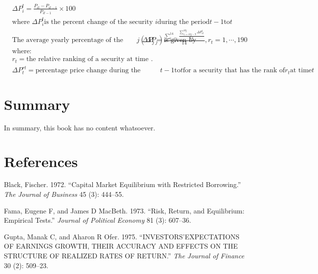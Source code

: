 \documentclass[
  letterpaper,
  DIV=11,
  numbers=noendperiod]{scrreprt}
\newlength{\cslhangindent}
\newlength{\cslentryspacingunit} %
\newenvironment{CSLReferences}[2] %
 {%
  \setlength{\parindent}{0pt}
  \ifodd #1
  \let\oldpar\par
  \def\par{\hangindent=\cslhangindent\oldpar}
  \fi
  \setlength{\parskip}{#2\cslentryspacingunit}
 }%
 {}
\begin{document}
\begin{align}
    & \Delta P_{i}^{t} = \frac{P_{it}-P_{it-1}}{P_{it-1}} \times 100 \\
    & \text{where } \Delta P_{i}^{t} \text{is the percent change of the security } i \text{during the period} t-1 \text{to} t \nonumber \\
    & \text{The average yearly percentage of the prices change for portfolio} j (\Delta P_j) \text{is given by}
    & \Delta P_{j} =\frac{\sum_{t=1}^{14} \frac{\sum_{r_t=10j-9}^{10j} \Delta P_{rt}^{t}}{14} }{14}, r_{t}=1,\cdots,190 \nonumber\\
    & \text{where:} \nonumber \\
    & r_{t} = \text{the relative ranking of a security at time t according to its prediction error at that year}. \\
    & \Delta P_{t}^{rt} = \text{percentage price change during the period} t-1 \text{to} t \text{for a security that has the rank of} r_t \text{at time} t
\end{align}
\label{Equation:OferEquation1975}


\hypertarget{summary}{%
\chapter{Summary}\label{summary}}

In summary, this book has no content whatsoever.


\hypertarget{references}{%
\chapter*{References}\label{references}}


\hypertarget{refs}{}
\begin{CSLReferences}{1}{0}
\leavevmode{}%
Black, Fischer. 1972. {``Capital Market Equilibrium with Restricted
Borrowing.''} \emph{The Journal of Business} 45 (3): 444--55.

\leavevmode{}%
Fama, Eugene F, and James D MacBeth. 1973. {``Risk, Return, and
Equilibrium: Empirical Tests.''} \emph{Journal of Political Economy} 81
(3): 607--36.

\leavevmode{}%
Gupta, Manak C, and Aharon R Ofer. 1975. {``INVESTORS'EXPECTATIONS OF
EARNINGS GROWTH, THEIR ACCURACY AND EFFECTS ON THE STRUCTURE OF REALIZED
RATES OF RETURN.''} \emph{The Journal of Finance} 30 (2): 509--23.

\end{CSLReferences}
\end{document}
